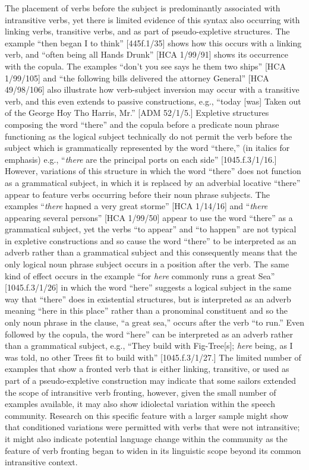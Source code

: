   The placement of verbs before the subject is predominantly associated with intransitive verbs, yet there is limited evidence of this syntax also occurring with linking verbs, transitive verbs, and as part of pseudo-expletive structures. The example “then began I to think” [445f.1/35] shows how this occurs with a linking verb, and “often being all Hands Drunk” [HCA 1/99/91] shows its occurrence with the copula. The examples “don’t you see says he them two ships” [HCA 1/99/105] and “the following bills delivered the attorney General” [HCA 49/98/106] also illustrate how verb-subject inversion may occur with a transitive verb, and this even extends to passive constructions, e.g., “today [was] Taken out of the George Hoy Tho Harris, Mr.” [ADM 52/1/5.] Expletive structures composing the word “there” and the copula before a predicate noun phrase functioning as the logical subject technically do not permit the verb before the subject which is grammatically represented by the word “there,” (in italics for emphasis) e.g., “\textit{there}\textbf{ }are the principal ports on each side” [1045.f.3/1/16.] However, variations of this structure in which the word “there” does not function as a grammatical subject, in which it is replaced by an adverbial locative “there” appear to feature verbs occurring before their noun phrase subjects. The examples “\textit{there} hapned a very great storme” [HCA 1/14/16] and “\textit{there} appearing several persons” [HCA 1/99/50] appear to use the word “there” as a grammatical subject, yet the verbs “to appear” and “to happen” are not typical in expletive constructions and so cause the word “there” to be interpreted as an adverb rather than a grammatical subject and this consequently means that the only logical noun phrase subject occurs in a position after the verb.  The same kind of effect occurs in the example “for \textit{here} commonly runs a great Sea” [1045.f.3/1/26] in which the word “here” suggests a logical subject in the same way that “there” does in existential structures, but is interpreted as an adverb meaning “here in this place” rather than a pronominal constituent and so the only noun phrase in the clause, “a great sea,” occurs after the verb “to run.” Even followed by the copula, the word “here” can be interpreted as an adverb rather than a grammatical subject, e.g., “They build with Fig-Tree[s]; \textit{here} being, as I was told, no other Trees fit to build with” [1045.f.3/1/27.] The limited number of examples that show a fronted verb that is either linking, transitive, or used as part of a pseudo-expletive construction may indicate that some sailors extended the scope of intransitive verb fronting, however, given the small number of examples available, it may also show idiolectal variation within the speech community.  Research on this specific feature with a larger sample might show that conditioned variations were permitted with verbs that were not intransitive; it might also indicate potential language change within the community as the feature of verb fronting began to widen in its linguistic scope beyond its common intransitive context. 

